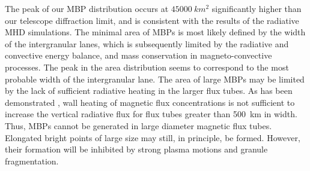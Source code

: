 \documentclass{emulateapj}
\begin{document}
The peak of our MBP distribution occurs at $45000~km^{2}$ significantly higher than our telescope diffraction limit, and is consistent with the results of the radiative MHD simulations. 
The minimal area of MBPs is most likely defined by the width of the intergranular lanes, which is subsequently limited by the radiative and convective energy balance, and mass conservation in magneto-convective processes. The peak in the area distribution seems to correspond to the most probable width of the intergranular lane. The area of large MBPs may be limited by the lack of sufficient radiative heating in the larger flux tubes. As has been demonstrated \citep[see e.g.][]{Ber95}, wall heating of magnetic flux concentrations is not sufficient to increase the vertical radiative flux for flux tubes greater than 500~km in width. Thus, MBPs cannot be generated in large diameter magnetic flux tubes. Elongated bright points of large size may still, in principle, be formed. However, their formation will be inhibited by strong plasma motions and granule fragmentation.
\end{document}
